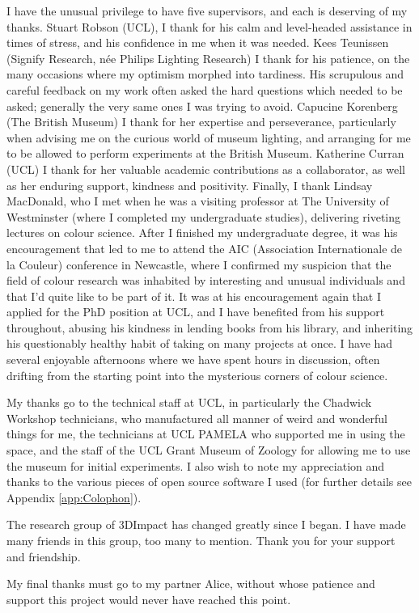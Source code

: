 \begin{acknowledgements}
I have the unusual privilege to have five supervisors, and each is deserving of my thanks. Stuart Robson (\gls{UCL}), I thank for his calm and level-headed assistance in times of stress, and his confidence in me when it was needed. Kees Teunissen (Signify Research, née Philips Lighting Research) I thank for his patience, on the many occasions where my optimism morphed into tardiness. His scrupulous and careful feedback on my work often asked the hard questions which needed to be asked; generally the very same ones I was trying to avoid. Capucine Korenberg (The British Museum) I thank for her expertise and perseverance, particularly when advising me on the curious world of museum lighting, and arranging for me to be allowed to perform experiments at the British Museum.
Katherine Curran (\gls{UCL}) I thank for her valuable academic contributions as a collaborator, as well as her enduring support, kindness and positivity.
Finally, I thank Lindsay MacDonald, who I met when he was a visiting professor at The University of Westminster (where I completed my undergraduate studies), delivering riveting lectures on colour science. After I finished my undergraduate degree, it was his encouragement that led to me to attend the AIC (Association Internationale de la Couleur) conference in Newcastle, where I confirmed my suspicion that the field of colour research was inhabited by interesting and unusual individuals and that I'd quite like to be part of it. It was at his encouragement again that I applied for the PhD position at \gls{UCL}, and I have benefited from his support throughout, abusing his kindness in lending books from his library, and inheriting his questionably healthy habit of taking on many projects at once. I have had several enjoyable afternoons where we have spent hours in discussion, often drifting from the starting point into the mysterious corners of colour science.

My thanks go to the technical staff at \gls{UCL}, in particularly the Chadwick Workshop technicians, who manufactured all manner of weird and wonderful things for me, the technicians at \gls{UCL} \acrshort{PAMELA} who supported me in using the space, and the staff of the \gls{UCL} Grant Museum of Zoology for allowing me to use the museum for initial experiments. I also wish to note my appreciation and thanks to the various pieces of open source software I used (for further details see Appendix \ref{app:Colophon}).

The research group of 3DImpact has changed greatly since I began. I have made many friends in this group, too many to mention. Thank you for your support and friendship.

My final thanks must go to my partner Alice, without whose patience and support this project would never have reached this point.

\end{acknowledgements}